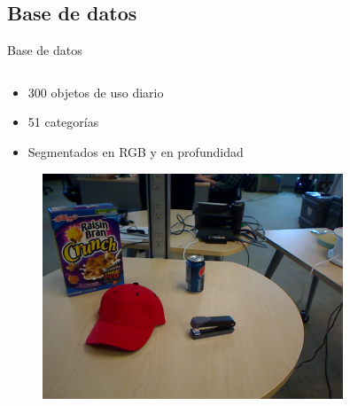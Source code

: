 \documentclass[]{beamer}
\begin{document}
\subsection{Base de datos}
\begin{frame}{Base de datos}
    \begin{columns}[t]
        \begin{column}{5cm}
            \begin{itemize}
                \item 300 objetos de uso diario
                \item 51 categorías
                \item Segmentados en RGB y en profundidad
            \end{itemize}

            \begin{figure}
                \includegraphics[width=0.8\textwidth]{img/base/scene.png}
            \end{figure}


\end{column}
\end{columns}
\end{frame}
\end{document}
